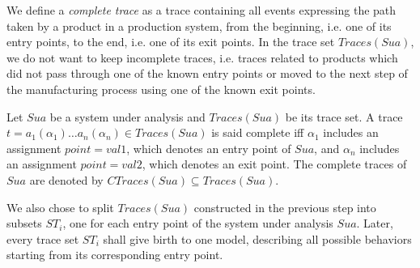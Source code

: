 We define a \textit{complete trace} as a trace containing all
events expressing the path taken by a product in a production
system, from the beginning, i.e. one of its entry points, to the
end, i.e. one of its exit points. In the trace set $Traces(Sua)$,
we do not want to keep incomplete traces, i.e.  traces related to
products which did not pass through one of the known entry points
or moved to the next step of the manufacturing process using one
of the known exit points.

\begin{definition}
Let $\mathit{Sua}$ be a system under analysis and $Traces({Sua})$
be its trace set. A trace $t=a_1(\alpha_1) \dots a_n(\alpha_n) \in
Traces({Sua})$ is said complete iff $\alpha_1$ includes an
assignment $point=val1$, which denotes an entry point of
$\mathit{Sua}$, and $\alpha_n$ includes an assignment
$point=val2$, which denotes an exit point.  The complete traces
of $\mathit{Sua}$ are denoted by $CTraces({Sua}) \subseteq
Traces({Sua})$.
\end{definition}

We also chose to split $Traces(Sua)$ constructed in the previous step
into subsets $ST_i$, one for each entry point of the system under
analysis $\mathit{Sua}$. Later, every trace set $ST_i$ shall give birth to
one model, describing all possible behaviors starting from its
corresponding entry point.

